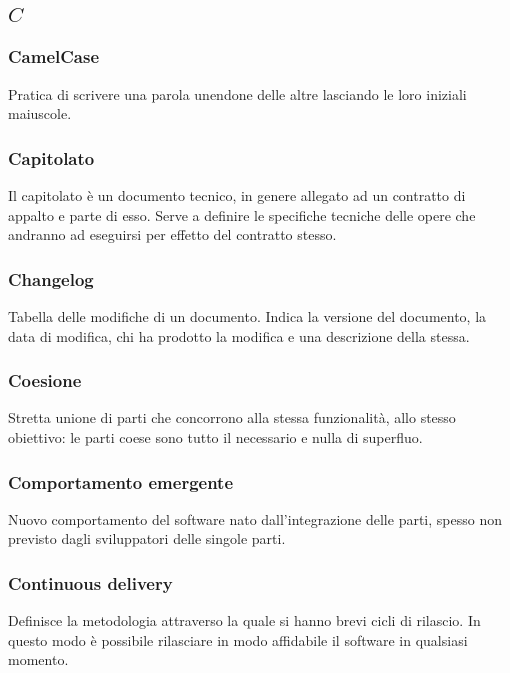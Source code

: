 \subsection*{\quad$C\quad$}
\subsubsection*{CamelCase}
Pratica di scrivere una parola unendone delle altre lasciando le loro iniziali maiuscole.

\subsubsection*{Capitolato}
Il capitolato è un documento tecnico, in genere allegato ad un contratto di appalto e parte di esso. Serve a definire le specifiche tecniche delle opere che andranno ad eseguirsi per effetto del contratto stesso.

\subsubsection*{Changelog}
Tabella delle modifiche di un documento. Indica la versione del documento, la data di modifica, chi ha prodotto
la modifica e una descrizione della stessa.

\subsubsection*{Coesione}
Stretta unione di parti che concorrono alla stessa funzionalità, allo stesso obiettivo: le parti coese sono tutto il necessario e nulla di superfluo.

\subsubsection*{Comportamento emergente}
Nuovo comportamento del software nato dall'integrazione delle parti, spesso non previsto dagli sviluppatori delle singole parti.

\subsubsection*{Continuous delivery}
Definisce la metodologia attraverso la quale si hanno brevi cicli di rilascio. In questo modo è possibile rilasciare in modo affidabile il software in qualsiasi momento.

